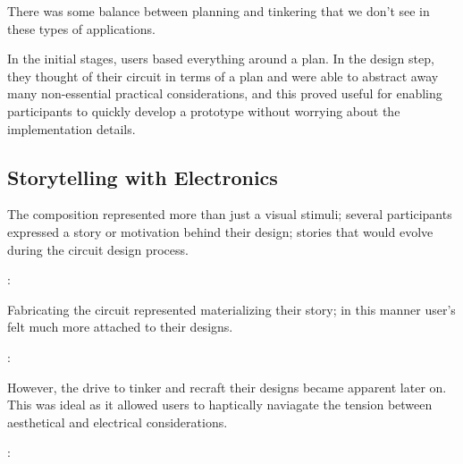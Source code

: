 \documentclass{sigchi}
\begin{document}
  There was some balance between planning and tinkering that we don't see in these types of applications.
  
  In the initial stages, users based everything around a plan. In the design step, they thought of their circuit in terms of a plan and were able to abstract away many non-essential practical considerations, and this proved useful for enabling participants to quickly develop a prototype without worrying about the implementation details.
  
  \subsection{Storytelling with Electronics}
  The composition represented more than just a visual stimuli; several participants expressed a story or motivation behind their design; stories that would evolve during the circuit design process.
  \begin{myquote}
   \vspace{-2pt}
    :
    \vspace{-2pt}
  \end{myquote}
  Fabricating the circuit represented materializing their story; in this manner user's felt much more attached to their designs.
  
  \begin{myquote}
   \vspace{-2pt}
    :
    \vspace{-2pt}
  \end{myquote}
  
  However, the drive to tinker and recraft their designs became apparent later on. This was ideal as it allowed users to haptically naviagate the tension between aesthetical and electrical considerations.
  
  \begin{myquote}
   \vspace{-2pt}
    :
    \vspace{-2pt}
  \end{myquote}
  
\end{document}
